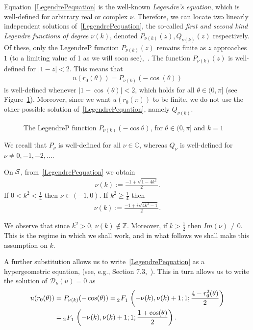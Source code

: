 Equation~\eqref{LegendrePequation} is the well-known {\it Legendre's
equation}, which is well-defined for arbitrary real or complex $\nu$.
Therefore, we can locate two linearly independent solutions
of~\eqref{LegendrePequation}, the so-called {\it first and second kind
Legendre functions of degree $\nu(k)$}, denoted $ P_{\nu(k)}(z),
Q_{\nu(k)}(z)$ respectively. Of these, only the  LegendreP function
$P_{\nu(k)}(z)$ remains finite as $z$ approaches $1$ (to a limiting
value of 1 as we will soon see),~\cite{lebedev}.  The function
$P_{\nu(k)}(z)$ is well-defined for $|1-z|<2$.  This means that
\begin{align*}
  u(r_0(\theta)) =  P_{\nu(k)}(-\cos(\theta))
\end{align*}
is well-defined whenever $|1+\cos(\theta)|<2$, which holds for all
$\theta \in(0,\pi]$ (see Figure~\ref{f:legendreP}).  Moreover, since we
want $u(r_0(\pi))$ to be finite, we do not use the other possible
solution of~\eqref{LegendrePequation}, namely $Q_{\nu(k)}$.
\begin{figure}[htps]
  \centering
  
  \caption{\label{f:legendreP} The LegendreP function
  $P_{\nu(k)}(-\cos\theta)$, for $\theta \in (0,\pi]$ and $k=1$}
\end{figure}  

We recall that $P_{\nu}$ is well-defined for all $\nu \in \mathbb{C}$,
whereas $Q_\nu$ is well-defined for $\nu \not= 0,-1,-2,...$. 

On $\S$, from~\eqref{LegendrePequation} we obtain\begin{align*}  
  \nu(k):=\frac{-1+\sqrt{1-4k^2}}{2}.
\end{align*}
If $0<k^2<\frac{1}{4}$ then $\nu \in (-1,0)$. If $k^2\geq\frac{1}{4}$ then 
\begin{align*}  
  \nu(k):=\frac{-1+i\sqrt{4k^2-1}}{2}.
\end{align*}

We observe that since $k^{2}>0$, $\nu(k) \notin \mathbb{Z}$. Moreover,
if $k>\frac{1}{2}$ then $Im(\nu)\not=0$. This is the regime in which we
shall work, and in what follows we shall make this assumption on $k$.

A further substitution allows us to write~\eqref{LegendrePequation} as
a hypergeometric equation, (see, e.g., Section 7.3,~\cite{lebedev}).
This in turn allows us to write the solution of $\mathcal{D}_k(u)=0$ as 
\begin{align*} 
  u(r_0(\theta)) &= P_{\nu(k)}(-\cos(\theta)) = 
    \tensor[_2]{F}{_1}\left(-\nu(k), \nu(k)+  1; 1; 
      \frac{4-r_0^2(\theta)}{2}\right) \\
    &=\tensor[_2]{F}{_1}\left(-\nu(k), \nu(k)+  1; 1;
    \frac{1+\cos(\theta)}{2}\right).
\end{align*} 


